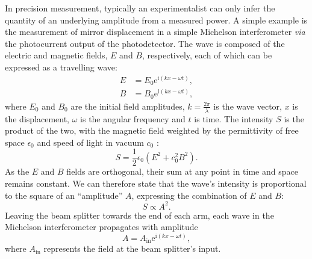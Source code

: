 In precision measurement, typically an experimentalist can only infer the quantity of an underlying amplitude from a measured power. A simple example is the measurement of mirror displacement in a simple Michelson interferometer \emph{via} the photocurrent output of the photodetector. The wave is composed of the electric and magnetic fields, $E$ and $B$, respectively, each of which can be expressed as a travelling wave:
\begin{align}
  E &= E_0 \text{e}^{\text{i} \left( kx - \omega t \right)}, \\
  B &= B_0 \text{e}^{\text{i}  \left( kx - \omega t \right)},
\end{align}
where $E_0$ and $B_0$ are the initial field amplitudes, $k = \frac{2 \pi}{\lambda}$ is the wave vector, $x$ is the displacement, $\omega$ is the angular frequency and $t$ is time. The intensity $S$ is the product of the two, with the magnetic field weighted by the permittivity of free space $\epsilon_0$ and speed of light in vacuum $c_0$ :
\begin{equation}
  S = \frac{1}{2} \epsilon_0 \left( E^2 + c_0^2 B^2 \right).
\end{equation}
As the $E$ and $B$ fields are orthogonal, their sum at any point in time and space remains constant. We can therefore state that the wave's intensity is proportional to the square of an ``amplitude'' $A$, expressing the combination of $E$ and $B$:
\begin{equation}
  S \propto A^2.
\end{equation}
Leaving the beam splitter towards the end of each arm, each wave in the Michelson interferometer propagates with amplitude
\begin{equation}
  A = A_{\text{in}} \text{e}^{\text{i} \left( kx - \omega t \right)},
\end{equation}
where $A_{\text{in}}$ represents the field at the beam splitter's input.

